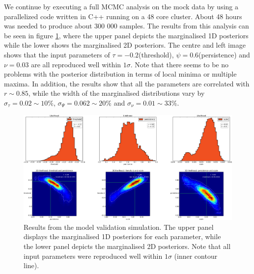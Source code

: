 \documentclass[aps,pre,twocolumn,letterpaper,floatfix,showpacs]{revtex4}
\begin{document}
We continue by executing a full MCMC analysis on the mock data by using a parallelized code written in C++ running on a 48 core cluster. About 48 hours was needed to produce about 300 000 samples. The results from this analysis can be seen in figure \ref{fig:mockdataresults_pts}, where the upper panel depicts the marginalised 1D posteriors while the lower shows the marginalised 2D posteriors. The centre and left image shows that the input parameters of $\tau=-0.2$(threshold), $\psi=0.6$(persistence) and $\nu=0.03$ are all reproduced well within $1 \sigma$. Note that there seems to be no problems with the posterior distribution in terms of local minima or multiple maxima. In addition, the results show that all the parameters are correlated with $r \sim 0.85$, while the width of the marginalised distributions vary by $\sigma_\tau = 0.02 \sim 10\%$, $\sigma_\Psi = 0.062 \sim 20\%$ and $\sigma_\nu = 0.01 \sim 33\%$. 

\begin{figure}
\includegraphics[width=.99\textwidth]{mock_data_results_pts.png}
\caption{Results from the model validation simulation. The upper panel displays the marginalised 1D posteriors for each parameter, while the lower panel depicts the marginalised 2D posteriors. Note that all input parameters were reproduced well within $1 \sigma$ (inner contour line).}
\label{fig:mockdataresults_pts}
\end{figure}
\end{document}
